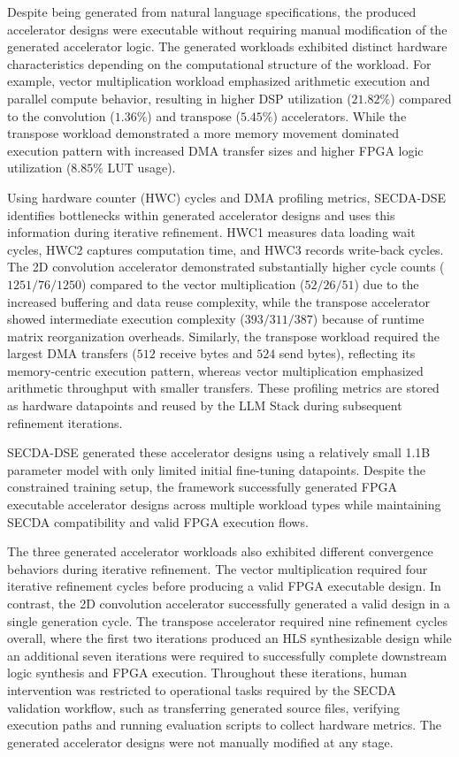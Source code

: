 Despite being generated from natural language specifications, the produced accelerator designs were executable without requiring manual modification of the generated accelerator logic. The generated workloads exhibited distinct hardware characteristics depending on the computational structure of the workload. For example, vector multiplication workload emphasized arithmetic execution and parallel compute behavior, resulting in higher DSP utilization (\(21.82\%\)) compared to the convolution (\(1.36\%\)) and transpose (\(5.45\%\)) accelerators. While the transpose workload demonstrated a more memory movement dominated execution pattern with increased DMA transfer sizes and higher FPGA logic utilization (\(8.85\%\) LUT usage).

Using hardware counter (HWC) cycles and DMA profiling metrics, SECDA-DSE identifies bottlenecks within generated accelerator designs and uses this information during iterative refinement. HWC1 measures data loading wait cycles, HWC2 captures computation time, and HWC3 records write-back cycles. 
The 2D convolution accelerator demonstrated substantially higher cycle counts (\(1251/76/1250\)) compared to the vector multiplication (\(52/26/51\)) due to the increased buffering and data reuse complexity, while the transpose accelerator showed intermediate execution complexity (\(393/311/387\)) because of runtime matrix reorganization overheads. 
Similarly, the transpose workload required the largest DMA transfers (\(512\) receive bytes and \(524\) send bytes), reflecting its memory-centric execution pattern, whereas vector multiplication emphasized arithmetic throughput with smaller transfers. These profiling metrics are stored as hardware datapoints and reused by the LLM Stack during subsequent refinement iterations.

SECDA-DSE generated these accelerator designs using a relatively small 1.1B parameter model with only limited initial fine-tuning datapoints. Despite the constrained training setup, the framework successfully generated FPGA executable accelerator designs across multiple workload types while maintaining SECDA compatibility and valid FPGA execution flows.

The three generated accelerator workloads also exhibited different convergence behaviors during iterative refinement. The vector multiplication required four iterative refinement cycles before producing a valid FPGA executable design. 
In contrast, the 2D convolution accelerator successfully generated a valid design in a single generation cycle. The transpose accelerator required nine refinement cycles overall, where the first two iterations produced an HLS synthesizable design while an additional seven iterations were required to successfully complete downstream logic synthesis and FPGA execution. Throughout these iterations, human intervention was restricted to operational tasks required by the SECDA validation workflow, such as transferring generated source files, verifying execution paths and running evaluation scripts to collect hardware metrics. The generated accelerator designs were not manually modified at any stage.


